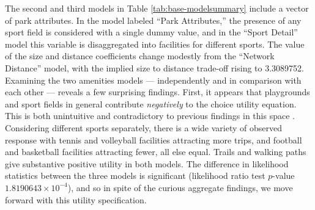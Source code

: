 \documentclass[]{elsarticle} %
\begin{document}
The second and third models in Table \ref{tab:base-modelsummary} include a
vector of park attributes. In the model labeled ``Park Attributes,'' the presence
of any sport field is considered with a single dummy value, and in the ``Sport
Detail'' model this variable is disaggregated into facilities for different
sports. The value of the size and distance coefficients change modestly from
the ``Network Distance'' model, with the implied size to distance trade-off rising
to 3.3089752. Examining the two amenities models --- independently and in
comparison with each other --- reveals a few surprising findings. First, it
appears that playgrounds and sport fields in general contribute \emph{negatively} to
the choice utility equation. This is both unintuitive and contradictory to
previous findings in this space \citep[e.g.,][]{Kinnell2006}. Considering different
sports separately, there is a wide variety of observed response with tennis and
volleyball facilities attracting more trips, and football and basketball
facilities attracting fewer, all else equal. Trails and walking paths give
substantive positive utility in both models. The difference in likelihood statistics
between the three models is significant (likelihood ratio test
\(p\)-value \ensuremath{1.8190643\times 10^{-4}}), and so in spite of the curious aggregate findings,
we move forward with this utility specification.
\end{document}

